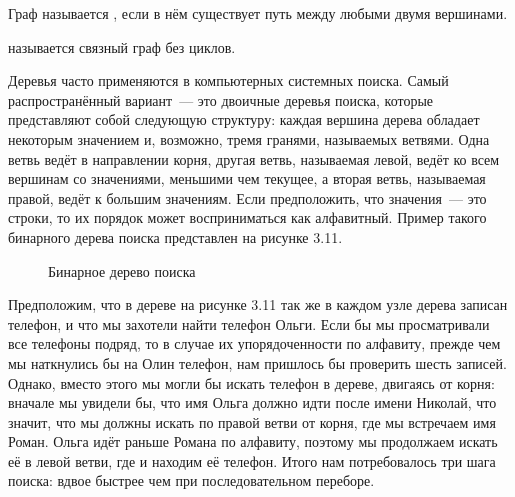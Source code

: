 \begin{definition}
Граф называется , если в нём существует путь между любыми двумя вершинами.
\end{definition}

\begin{definition}
 называется связный граф без циклов.
\end{definition}

Деревья часто применяются в компьютерных системных поиска. Самый распространённый вариант~--- это двоичные деревья поиска, которые представляют собой следующую структуру: каждая вершина дерева обладает некоторым значением и, возможно, тремя гранями, называемых ветвями. Одна ветвь ведёт в направлении корня, другая ветвь, называемая левой, ведёт ко всем вершинам со значениями, меньшими чем текущее, а вторая ветвь, называемая правой, ведёт к большим значениям. Если предположить, что значения~--- это строки, то их порядок может восприниматься как алфавитный. Пример такого бинарного дерева поиска представлен на рисунке 3.11.


\begin{figure}[h]
\centering
{}
\caption{Бинарное дерево поиска}
\end{figure}

Предположим, что в дереве на рисунке 3.11 так же в каждом узле дерева записан телефон, и что мы захотели найти телефон Ольги. Если бы мы просматривали все телефоны подряд, то в случае их упорядоченности по алфавиту, прежде чем мы наткнулись бы на Олин телефон, нам пришлось бы проверить шесть записей. Однако, вместо этого мы могли бы искать телефон в дереве, двигаясь от корня: вначале мы увидели бы, что имя Ольга должно идти после имени Николай, что значит, что мы должны искать по правой ветви от корня, где мы встречаем имя Роман. Ольга идёт раньше Романа по алфавиту, поэтому мы продолжаем искать её в левой ветви, где и находим её телефон. Итого нам потребовалось три шага поиска: вдвое быстрее чем при последовательном переборе.

